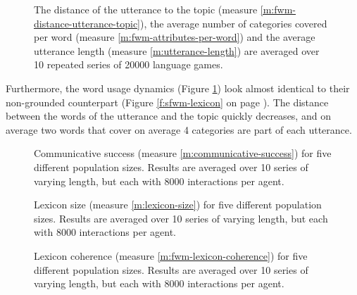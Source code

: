 \begin{figure}[t]
  \caption{The distance of the utterance to the topic (measure
    \ref{m:fwm-distance-utterance-topic}), the average number of
    categories covered per word (measure
    \ref{m:fwm-attributes-per-word}) and the average utterance length
    (measure \ref{m:utterance-length}) are averaged over 10 repeated
    series of 20000 language games.}
  \label{f:gfwm-lexicon}
\end{figure}


Furthermore, the word usage dynamics (Figure \ref{f:gfwm-lexicon})
look almost identical to their non-grounded counterpart (Figure
\ref{f:sfwm-lexicon} on page \pageref{f:sfwm-lexicon}). The distance
between the words of the utterance and the topic quickly decreases,
and on average two words that cover on average 4 categories are part
of each utterance.

\startfiguregroup


\begin{figure}[t]
  \caption{Communi\-cative success (measure
    \ref{m:communicative-success}) for five different population
    sizes. Results are averaged over 10 series of varying length, but
    each with 8000 interactions per agent.}
  \label{f:gfwm-communicative-success-vs-population-size}
\end{figure}

\begin{figure}[t]
  \caption{Lexicon size (measure \ref{m:lexicon-size}) for five
    different population sizes. Results are averaged over 10 series of
    varying length, but each with 8000 interactions per agent.}
  \label{f:gfwm-lexicon-size-vs-population-size}
\end{figure}

\begin{figure}[t]
  \caption{Lexicon coherence (measure \ref{m:fwm-lexicon-coherence})
    for five different population sizes. Results are averaged over 10
    series of varying length, but each with 8000 interactions per
    agent.}
  \label{f:gfwm-lexicon-coherence-vs-population-size}
\end{figure}

\stopfiguregroup

~\\

